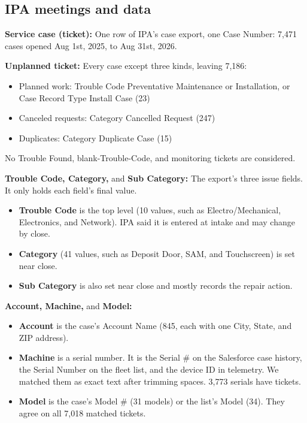 \subsection*{IPA meetings and data}
\begin{ipadefs}
\item \textbf{Service case (ticket):} One row of IPA's case export, one Case Number: 7,471 cases opened Aug 1st, 2025, to Aug 31st, 2026.
\item \textbf{Unplanned ticket:} Every case except three kinds, leaving 7,186:
\begin{itemize}
\item Planned work: Trouble Code Preventative Maintenance or Installation, or Case Record Type Install Case (23)
\item Canceled requests: Category Cancelled Request (247)
\item Duplicates: Category Duplicate Case (15)
\end{itemize}
\par No Trouble Found, blank-Trouble-Code, and monitoring tickets are considered.
\item \textbf{Trouble Code, Category,} and \textbf{Sub Category:} The export's three issue fields. It only holds each field's final value.
\begin{itemize}
\item \textbf{Trouble Code} is the top level (10 values, such as Electro/Mechanical, Electronics, and Network). IPA said it is entered at intake and may change by close.
\item \textbf{Category} (41 values, such as Deposit Door, SAM, and Touchscreen) is set near close.
\item \textbf{Sub Category} is also set near close and mostly records the repair action.
\end{itemize}
\item \textbf{Account, Machine,} and \textbf{Model:}
\begin{itemize}
\item \textbf{Account} is the case's Account Name (845, each with one City, State, and ZIP address).
\item \textbf{Machine} is a serial number. It is the Serial \# on the Salesforce case history, the Serial Number on the fleet list, and the device ID in telemetry. We matched them as exact text after trimming spaces. 3,773 serials have tickets.
\item \textbf{Model} is the case's Model \# (31 models) or the list's Model (34). They agree on all 7,018 matched tickets.

\end{itemize}
\end{ipadefs}
